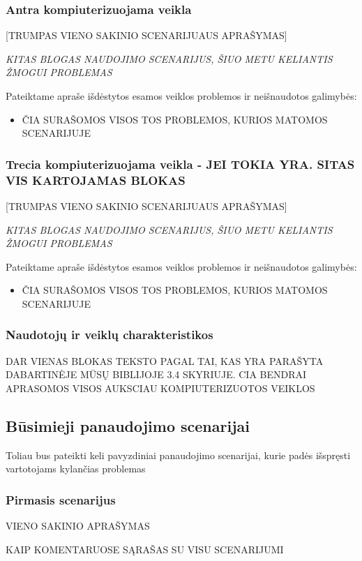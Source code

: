 \documentclass{VUMIFPSkursinis}
\begin{document}
\subsubsection{Antra kompiuterizuojama veikla}
[TRUMPAS VIENO SAKINIO SCENARIJUAUS APRAŠYMAS]

\textit{KITAS BLOGAS NAUDOJIMO SCENARIJUS, ŠIUO METU KELIANTIS ŽMOGUI PROBLEMAS}

Pateiktame apraše išdėstytos esamos veiklos problemos ir neišnaudotos galimybės:  
\begin{itemize}
\item ČIA SURAŠOMOS VISOS TOS PROBLEMOS, KURIOS MATOMOS SCENARIJUJE
\end{itemize}

\subsubsection{Trecia kompiuterizuojama veikla - JEI TOKIA YRA. SITAS VIS KARTOJAMAS BLOKAS}
[TRUMPAS VIENO SAKINIO SCENARIJUAUS APRAŠYMAS]

\textit{KITAS BLOGAS NAUDOJIMO SCENARIJUS, ŠIUO METU KELIANTIS ŽMOGUI PROBLEMAS}

Pateiktame apraše išdėstytos esamos veiklos problemos ir neišnaudotos galimybės:  
\begin{itemize}
\item ČIA SURAŠOMOS VISOS TOS PROBLEMOS, KURIOS MATOMOS SCENARIJUJE
\end{itemize}

\subsubsection{Naudotojų ir veiklų charakteristikos}
DAR VIENAS BLOKAS TEKSTO PAGAL TAI, KAS YRA PARAŠYTA DABARTINĖJE MŪSŲ BIBLIJOJE 3.4 SKYRIUJE. CIA BENDRAI APRASOMOS VISOS AUKSCIAU KOMPIUTERIZUOTOS VEIKLOS

\subsection{Būsimieji panaudojimo scenarijai}
Toliau bus pateikti keli pavyzdiniai panaudojimo scenarijai, kurie padės išspręsti vartotojams kylančias problemas

\subsubsection{Pirmasis scenarijus}
VIENO SAKINIO APRAŠYMAS

KAIP KOMENTARUOSE SĄRAŠAS SU VISU SCENARIJUMI
\end{document}
